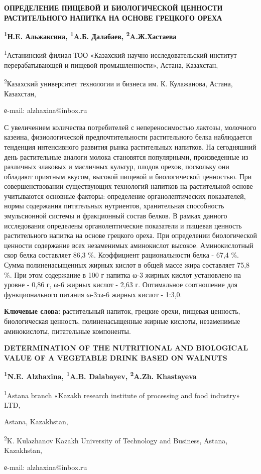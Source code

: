 \begin{center}
{\large\bfseries ОПРЕДЕЛЕНИЕ ПИЩЕВОЙ И БИОЛОГИЧЕСКОЙ ЦЕННОСТИ РАСТИТЕЛЬНОГО
НАПИТКА НА ОСНОВЕ ГРЕЦКОГО ОРЕХА}

{\bfseries \textsuperscript{1}Н.E. Альжаксина, \textsuperscript{1}A.Б.
Далабаев, \textsuperscript{2}A.Ж.Хастаева}

\textsuperscript{1}Астанинский филиал ТОО «Казахский
научно-исследовательский институт перерабатывающей и пищевой
промышленности», Астана, Казахстан,

\textsuperscript{2}Казахский университет технологии и бизнеса им. К.
Кулажанова, Астана, Казахстан,

е-mail: alzhaxina@inbox.ru
\end{center}

С увеличением количества потребителей с непереносимостью лактозы,
молочного казеина, физиологической предпочтительности растительного
белка наблюдается тенденция интенсивного развития рынка растительных
напитков. На сегодняшний день растительные аналоги молока становятся
популярными, произведенные из различных злаковых и масличных культур,
плодов орехов, поскольку они обладают приятным вкусом, высокой пищевой и
биологической ценностью. При совершенствовании существующих технологий
напитков на растительной основе учитываются основные факторы:
определение органолептических показателей, нормы содержания питательных
нутриентов, хранительная способность эмульсионной системы и фракционный
состав белков. В рамках данного исследования определены
органолептические показатели и пищевая ценность растительного напитка на
основе грецкого ореха. При определении биологической ценности содержание
всех незаменимых аминокислот высокое. Аминокислотный скор белка
составляет 86,3 \%. Коэффициент рациональности белка - 67,4 \%. Сумма
полиненасыщенных жирных кислот в общей массе жира составляет 75,8 \%.
При этом содержание в 100 г напитка ω-3 жирных кислот установлено на
уровне - 0,86 г, ω-6 жирных кислот - 2,63 г. Оптимальное соотношение для
функционального питания ω-3:ω-6 жирных кислот - 1:3,0.

{\bfseries Ключевые слова:} растительный напиток, грецкие орехи, пищевая
ценность, биологическая ценность, полиненасыщенные жирные кислоты,
незаменимые аминокислоты, питательные компоненты.

\begin{center}
{\large\bfseries DETERMINATION OF THE NUTRITIONAL AND BIOLOGICAL VALUE OF A VEGETABLE DRINK BASED ON WALNUTS}

{\bfseries \textsuperscript{1}N.E. Alzhaxina, \textsuperscript{1}A.B.
Dalabayev, \textsuperscript{2}A.Zh. Khastayeva}

\textsuperscript{1}Astana branch «Kazakh research institute of
processing and food industry» LTD,

Astana, Kazakhstan,

\textsuperscript{2}K. Kulazhanov Kazakh University of Technology and
Business, Astana, Kazakhstan,

е-mail: alzhaxina@inbox.ru
\end{center}

